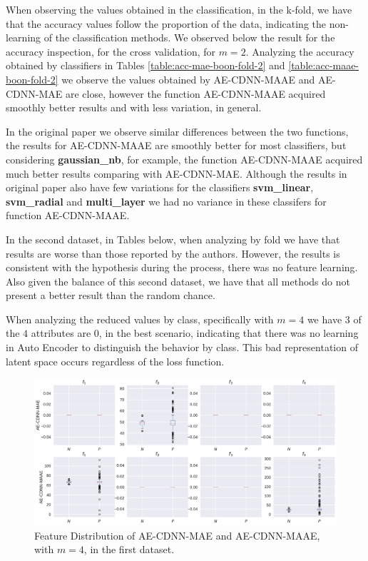 When observing the values obtained in the classification, in the k-fold, we have that the accuracy values follow the proportion of the data, indicating the non-learning of the classification methods. We observed below the result for the accuracy inspection, for the cross validation, for $m = 2$. Analyzing the accuracy obtained by classifiers in Tables \ref{table:acc-mae-boon-fold-2} and \ref{table:acc-maae-boon-fold-2} we observe the values obtained by AE-CDNN-MAAE and AE-CDNN-MAE are close, however the function AE-CDNN-MAAE acquired smoothly better results and with less variation, in general. 





In the original paper we observe similar differences between the two functions, the results for AE-CDNN-MAAE are smoothly better for most classifiers, but considering \textbf{gaussian\_nb}, for example, the function AE-CDNN-MAAE acquired much better results comparing with AE-CDNN-MAE. Although the results in original paper also have few variations for the classifiers \textbf{svm\_linear}, \textbf{svm\_radial} and \textbf{multi\_layer} we had no variance in these classifers for function AE-CDNN-MAAE.

In the second dataset, in Tables below, when analyzing by fold we have that results are worse than those reported by the authors. However, the results is consistent with the hypothesis during the process, there was no feature learning. Also given the balance of this second dataset, we have that all methods do not present a better result than the random chance. 





When analyzing the reduced values by class, specifically with $m = 4$ we have $3$ of the $4$ attributes are $0$, in the best scenario, indicating that there was no learning in Auto Encoder to distinguish the behavior by class. This bad representation of latent space occurs regardless of the loss function.


\begin{figure}[!ht]
\centering
\includegraphics[width=0.8\linewidth]{figure/feature_distribution_4.pdf}
  \caption{Feature Distribution of AE-CDNN-MAE and AE-CDNN-MAAE, with $m=4$, in the first dataset. }
\label{fig:feature_distribution_4}
\end{figure}

